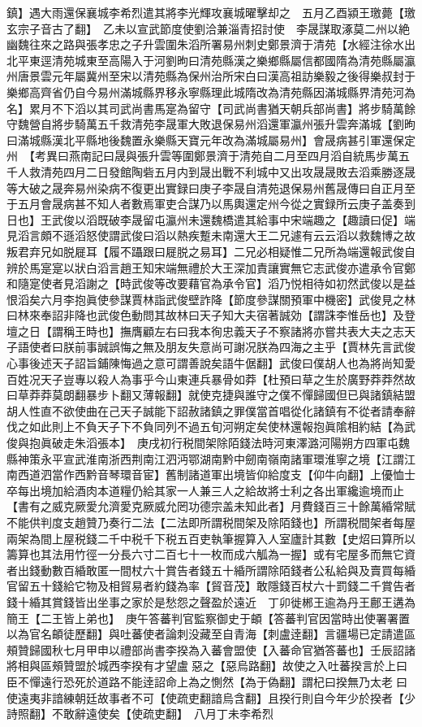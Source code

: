 鎮】遇大雨還保襄城李希烈遣其將李光輝攻襄城曜擊却之　五月乙酉潁王璬薨【璬玄宗子音古了翻】　乙未以宣武節度使劉洽兼淄青招討使　李晟謀取涿莫二州以絶幽魏往來之路與張孝忠之子升雲圍朱滔所署易州刺史鄭景濟于清苑【水經注徐水出北平東逕清苑城東至高陽入于河劉昫曰清苑縣漢之樂鄉縣屬信都國隋為清苑縣屬瀛州唐景雲元年屬冀州至宋以清苑縣為保州治所宋白曰漢高祖訪樂毅之後得樂叔封于樂鄉高齊省仍自今易州滿城縣界移永寧縣理此城隋改為清苑縣因滿城縣界清苑河為名】累月不下滔以其司武尚書馬寔為留守【司武尚書猶天朝兵部尚書】將步騎萬餘守魏營自將步騎萬五千救清苑李晟軍大敗退保易州滔還軍瀛州張升雲奔滿城【劉昫曰滿城縣漢北平縣地後魏置永樂縣天寶元年改為滿城屬易州】會晟病甚引軍還保定州　【考異曰燕南記曰晟與張升雲等圍鄭景濟于清苑自二月至四月滔自統馬步萬五千人救清苑四月二日發館陶砦五月内到晟出戰不利城中又出攻晟晟敗去滔乘勝逐晟等大破之晟奔易州染病不復更出實録曰庚子李晟自清苑退保易州舊晟傳曰自正月至于五月會晟病甚不知人者數焉軍吏合謀乃以馬輿還定州今從之實録所云庚子盖奏到日也】王武俊以滔既破李晟留屯瀛州未還魏橋遣其給事中宋端趣之【趣讀曰促】端見滔言頗不遜滔怒使謂武俊曰滔以熱疾蹔未南還大王二兄遽有云云滔以救魏博之故叛君弃兄如脱屣耳【履不躡跟曰屣脱之易耳】二兄必相疑惟二兄所為端還報武俊自辨於馬寔寔以狀白滔言趙王知宋端無禮於大王深加責讓實無它志武俊亦遣承令官鄭和隨寔使者見滔謝之【時武俊等改要藉官為承令官】滔乃悦相待如初然武俊以是益恨滔矣六月李抱眞使參謀賈林詣武俊壁詐降【節度參謀關預軍中機密】武俊見之林曰林來奉詔非降也武俊色動問其故林曰天子知大夫宿著誠効【謂誅李惟岳也】及登壇之日【謂稱王時也】撫膺顧左右曰我本徇忠義天子不察諸將亦嘗共表大夫之志天子語使者曰朕前事誠誤悔之無及朋友失意尚可謝况朕為四海之主乎【賈林先言武俊心事後述天子詔旨鋪陳悔過之意可謂善說矣語牛倨翻】武俊曰僕胡人也為將尚知愛百姓况天子豈專以殺人為事乎今山東連兵暴骨如莽【杜預曰草之生於廣野莽莽然故曰草莽莽莫朗翻暴步卜翻又薄報翻】就使克捷與誰守之僕不憚歸國但已與諸鎮結盟胡人性直不欲使曲在己天子誠能下詔赦諸鎮之罪僕當首唱從化諸鎮有不從者請奉辭伐之如此則上不負天子下不負同列不過五旬河朔定矣使林還報抱眞隂相約結【為武俊與抱眞破走朱滔張本】　庚戌初行税間架除陌錢法時河東澤潞河陽朔方四軍屯魏縣神策永平宣武淮南浙西荆南江泗沔鄂湖南黔中劒南嶺南諸軍環淮寧之境【江謂江南西道泗當作西黔音琴環音宦】舊制諸道軍出境皆仰給度支【仰牛向翻】上優恤士卒每出境加給酒肉本道糧仍給其家一人兼三人之給故將士利之各出軍纔逾境而止【書有之威克厥愛允濟愛克厥威允罔功德宗盖未知此者】月費錢百三十餘萬緍常賦不能供判度支趙贊乃奏行二法【二法即所謂税間架及除陌錢也】所謂税間架者每屋兩架為間上屋税錢二千中税千下税五百吏執筆握算入人室廬計其數【史炤曰算所以籌算也其法用竹徑一分長六寸二百七十一枚而成六觚為一握】或有宅屋多而無它資者出錢動數百緍敢匿一間杖六十賞告者錢五十緍所謂除陌錢者公私給與及賣買每緍官留五十錢給它物及相貿易者約錢為率【貿音茂】敢隱錢百杖六十罰錢二千賞告者錢十緍其賞錢皆出坐事之家於是愁怨之聲盈於遠近　丁卯徙郴王逾為丹王鄜王遘為簡王【二王皆上弟也】　庚午答蕃判官監察御史于頔【答蕃判官因當時出使署署置以為官名頔徒歷翻】與吐蕃使者論刺没藏至自青海【刺盧逹翻】言疆場已定請遣區頰贊歸國秋七月甲申以禮部尚書李揆為入蕃會盟使【入蕃命官猶答蕃也】壬辰詔諸將相與區頰贊盟於城西李揆有才望盧惡之【惡烏路翻】故使之入吐蕃揆言於上曰臣不憚遠行恐死於道路不能逹詔命上為之惻然【為于偽翻】謂杞曰揆無乃太老曰使遠夷非諳練朝廷故事者不可【使疏吏翻諳烏含翻】且揆行則自今年少於揆者【少詩照翻】不敢辭遠使矣【使疏吏翻】　八月丁未李希烈